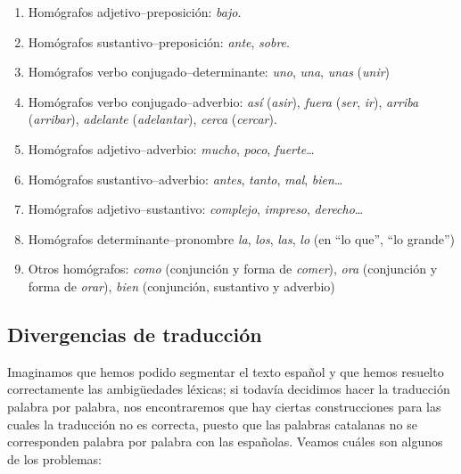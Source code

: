 \begin{enumerate}
\item Homógrafos adjetivo--preposición: \emph{bajo}. 

\item Homógrafos sustantivo--preposición: \emph{ante}, \emph{sobre}. 

\item Homógrafos verbo conjugado--determinante: \emph{uno}, \emph{una}, \emph{unas} (\emph{unir}) 

\item Homógrafos verbo conjugado--adverbio: \emph{así} (\emph{asir}), \emph{fuera} (\emph{ser}, \emph{ir}), \emph{ arriba} (\emph{arribar}), {\em adelante} (\emph{adelantar}), \emph{cerca} (\emph{cercar}). 

\item Homógrafos adjetivo--adverbio: \emph{mucho}, \emph{poco}, {\em fuerte}\ldots 

\item Homógrafos sustantivo--adverbio: \emph{antes}, \emph{tanto}, \emph{mal}, \emph{bien}\ldots 

\item Homógrafos adjetivo--sustantivo: \emph{complejo}, {\em impreso}, \emph{derecho}\ldots 

\item Homógrafos determinante--pronombre \emph{la}, \emph{los}, \emph{las}, \emph{lo} (en ``lo que'', ``lo grande'') 

\item Otros homógrafos: \emph{como} (conjunción y forma de \emph{comer}), \emph{ora} (conjunción y forma de \emph{orar}), \emph{bien} (conjunción, sustantivo y adverbio) 

\end{enumerate} 

\subsection{Divergencias de traducción} 

Imaginamos que hemos podido segmentar el texto español y que hemos resuelto correctamente las ambigüedades léxicas; si todavía decidimos hacer la traducción palabra por palabra, nos encontraremos que hay ciertas construcciones para las cuales la traducción no es correcta, puesto que las palabras catalanas no se corresponden palabra por palabra con las españolas. Veamos cuáles son algunos de los problemas: 

